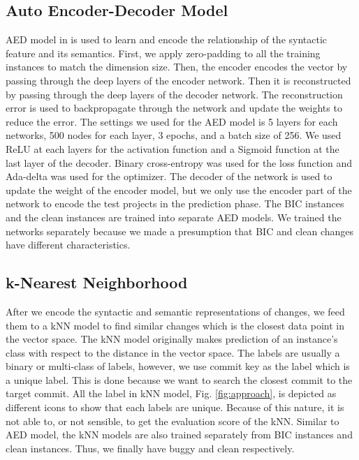 \subsection{Auto Encoder-Decoder Model}
AED model in {\simfin} is used to learn and encode the relationship of the syntactic feature and its semantics.
First, we apply zero-padding to all the training instances to match the dimension size.
Then, the encoder encodes the vector by passing through the deep layers of the encoder network.
Then it is reconstructed by passing through the deep layers of the decoder network.
The reconstruction error is used to backpropagate through the network and update the weights to reduce the error.
The settings we used for the AED model is 5 layers for each networks, 500 nodes for each layer, 3 epochs, and a batch size of 256.
We used ReLU at each layers for the activation function and a Sigmoid function at the last layer of the decoder.
Binary cross-entropy was used for the loss function and Ada-delta was used for the optimizer.
The decoder of the network is used to update the weight of the encoder model, but we only use the encoder part of the network to encode the test projects in the prediction phase.
The BIC instances and the clean instances are trained into separate AED models.
We trained the networks separately because we made a presumption that BIC and clean changes have different characteristics.

\subsection{k-Nearest Neighborhood}
After we encode the syntactic and semantic representations of changes, we feed them to a kNN model to find similar changes which is the closest data point in the vector space.
The kNN model originally makes prediction of an instance's class with respect to the distance in the vector space.
The labels are usually a binary or multi-class of labels, however, we use commit key as the label which is a unique label.
This is done because we want to search the closest commit to the target commit.
All the label in kNN model, Fig. \ref{fig:approach}, is depicted as different icons to show that each labels are unique.
Because of this nature, it is not able to, or not sensible, to get the evaluation score of the kNN.
Similar to AED model, the kNN models are also trained separately from BIC instances and clean instances.
Thus, we finally have buggy {\simfin} and clean {\simfin} respectively.

